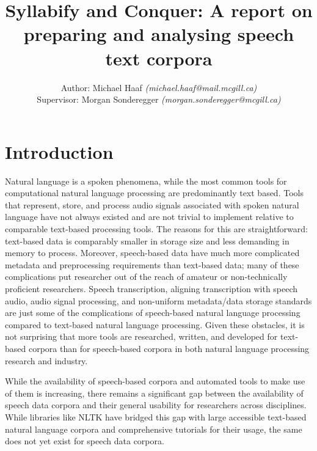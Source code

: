 \documentclass[11pt]{article}
\begin{document}
\title{Syllabify and Conquer: A report on preparing and analysing speech text corpora}
\author{Author: Michael Haaf \textit{(michael.haaf@mail.mcgill.ca)} \\ Supervisor: Morgan Sonderegger \textit{(morgan.sonderegger@mcgill.ca)}}

\maketitle
\begin{singlespace}
\tableofcontents
\end{singlespace}
\newpage

\section{Introduction}

Natural language is a spoken phenomena, while the most common tools for computational natural language processing are predominantly text based. Tools that represent, store, and process audio signals associated with spoken natural language have not always existed and are not trivial to implement relative to comparable text-based processing tools. The reasons for this are straightforward: text-based data is comparably smaller in storage size and less demanding in memory to process. Moreover, speech-based data have much more complicated metadata and preprocessing requirements than text-based data; many of these complications put researcher out of the reach of amateur or non-technically proficient researchers. Speech transcription, aligning transcription with speech audio, audio signal processing, and non-uniform metadata/data storage standards are just some of the complications of speech-based natural language processing compared to text-based natural language processing. Given these obstacles, it is not surprising that more tools are researched, written, and developed for text-based corpora than for speech-based corpora in both natural language processing research and industry.

While the availability of speech-based corpora and automated tools to make use of them is increasing\cite{mcauliffe_polyglot_2017}, there remains a significant gap between the availability of speech data corpora and their general usability for researchers across disciplines. While libraries like NLTK\cite{noauthor_nltk_nodate} have bridged this gap with large accessible text-based natural language corpora and comprehensive tutorials for their usage, the same does not yet exist for speech data corpora.
\end{document}
